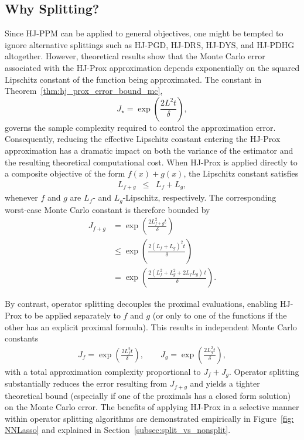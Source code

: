 \documentclass{article}
\theoremstyle{plain}
\theoremstyle{definition}
\theoremstyle{remark}
\begin{document}
\subsection{Why Splitting?}
\label{subsec:why_splitting}
Since HJ-PPM can be applied to general objectives, one might be tempted to ignore alternative splittings such as HJ-PGD, HJ-DRS, HJ-DYS, and HJ-PDHG altogether. However, theoretical results show that the Monte Carlo error associated with the HJ-Prox approximation depends exponentially on the squared Lipschitz constant of the function being approximated. The constant in Theorem~\ref{thm:hj_prox_error_bound_mc},
\begin{equation}
    J_\star = \exp\!\left(\frac{2 L^2 t}{\delta}\right),
\end{equation}
governs the sample complexity required to control the approximation error. Consequently, reducing the effective Lipschitz constant entering the HJ-Prox approximation has a dramatic impact on both the variance of the estimator and the resulting theoretical computational cost. When HJ-Prox is applied directly to a composite objective of the form \(f(x) + g(x)\), the Lipschitz constant satisfies
\begin{eqnarray}
L_{f+g} &\le& L_f + L_g,
\end{eqnarray}
whenever $f$ and $g$ are $L_f$- and $L_g$-Lipschitz, respectively. The corresponding worst-case Monte Carlo constant is therefore bounded by
\begin{align}
J_{f+g}
&= \exp\!\left(\frac{2 L_{f+g}^2 t}{\delta}\right) \\
& \le  \exp\!\left(\frac{2 (L_f + L_g)^2 t}{\delta}\right) \nonumber \\
&= \exp\!\left(\frac{2 (L_f^2 + L_g^2 + 2 L_f L_g)\, t}{\delta}\right).
\end{align}

By contrast, operator splitting decouples the proximal evaluations, enabling HJ-Prox to be applied separately to \(f\) and \(g\) (or only to one of the functions if the other has an explicit proximal formula). This results in independent Monte Carlo constants
\begin{eqnarray}
J_f = \exp\!\left(\frac{2 L_f^2 t}{\delta}\right),
\qquad
J_g = \exp\!\left(\frac{2 L_g^2 t}{\delta}\right),
\end{eqnarray}
with a total approximation complexity proportional to $J_f + J_g$. Operator splitting substantially reduces the error resulting from $J_{f+g}$ and yields a  tighter theoretical bound (especially if one of the proximals has a closed form solution) on the Monte Carlo error. The benefits of applying HJ-Prox in a selective manner within operator splitting algorithms are demonstrated empirically in Figure~\ref{fig: NNLasso} and explained in Section~\ref{subsec:split_vs_nonsplit}. 
\end{document}
